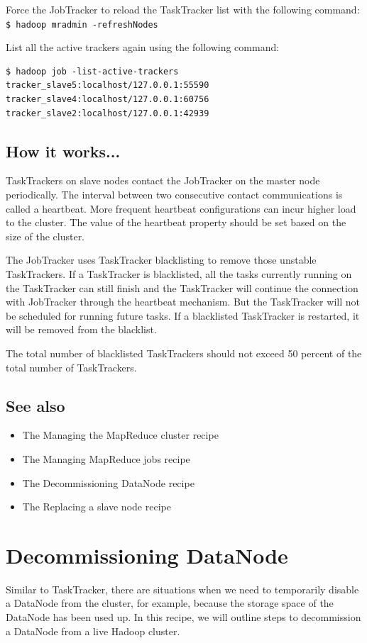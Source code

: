 Force the JobTracker to reload the TaskTracker list with the following command: \\
\verb|$ hadoop mradmin -refreshNodes|

List all the active trackers again using the following command:
\begin{verbatim}
$ hadoop job -list-active-trackers
tracker_slave5:localhost/127.0.0.1:55590
tracker_slave4:localhost/127.0.0.1:60756
tracker_slave2:localhost/127.0.0.1:42939
\end{verbatim}

\subsection*{How it works...}
TaskTrackers on slave nodes contact the JobTracker on the master node periodically. The interval between two consecutive contact communications is called a heartbeat. More frequent heartbeat configurations can incur higher load to the cluster. The value of the heartbeat property should be set based on the size of the cluster.

The JobTracker uses TaskTracker blacklisting to remove those unstable TaskTrackers. If a TaskTracker is blacklisted, all the tasks currently running on the TaskTracker can still finish and the TaskTracker will continue the connection with JobTracker through the heartbeat mechanism. But the TaskTracker will not be scheduled for running future tasks. If a blacklisted TaskTracker is restarted, it will be removed from the blacklist.

The total number of blacklisted TaskTrackers should not exceed 50 percent of the total number of TaskTrackers.
\subsection*{See also}
\begin{itemize}
  \item The Managing the MapReduce cluster recipe
  \item The Managing MapReduce jobs recipe
  \item The Decommissioning DataNode recipe
  \item The Replacing a slave node recipe
\end{itemize}

\section{Decommissioning DataNode}
Similar to TaskTracker, there are situations when we need to temporarily disable a DataNode from the cluster, for example, because the storage space of the DataNode has been used up. In this recipe, we will outline steps to decommission a DataNode from a live Hadoop cluster.
